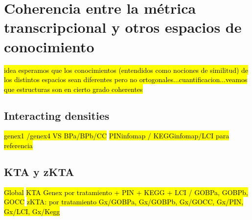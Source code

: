 \section{Coherencia entre la métrica transcripcional y otros espacios de conocimiento}
\hl{idea esperamos que los conocimientos (entendidos como nociones de similitud) de los distintos espacios sean diferentes pero no ortogonales...cuantificacion...veamos que estructuras son en cierto grado coherentes}
\subsection{Interacting densities}
\hl{genex1 /genex4  VS BPa/BPb/CC}
\hl{PINinfomap / KEGGinfomap/LCI para referencia}
\subsection{KTA y zKTA}
\hl{Global}
\hl{KTA Genex por tratamiento + PIN + KEGG + LCI / GOBPa, GOBPb, GOCC}
\hl{zKTA: por tratamiento Gx/GOBPa, Gx/GOBPb, Gx/GOCC, Gx/PIN, Gx/LCI, Gx/Kegg}